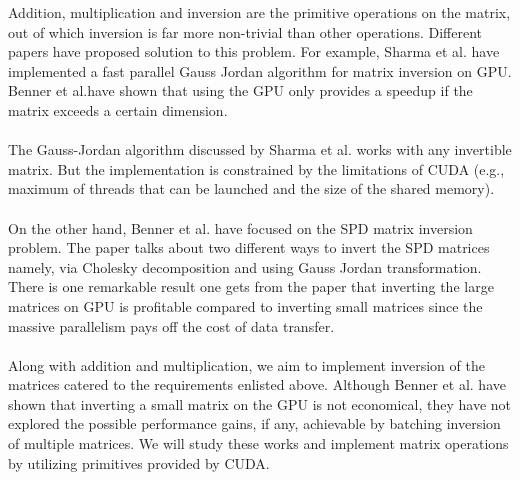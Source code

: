 \documentclass[11pt]{article}
\begin{document}
Addition, multiplication and inversion are the primitive operations on the matrix, out of which inversion is far more non-trivial than other operations. Different papers have proposed solution to this problem. For example, Sharma\cite{sharma} et al. have implemented a fast parallel Gauss Jordan algorithm for matrix inversion on GPU. Benner\cite{benner}  et al.have shown that using the GPU only provides a speedup if the matrix exceeds a certain dimension. \\\\
The Gauss-Jordan algorithm discussed by Sharma et al. works with any invertible matrix. But the implementation is constrained by the limitations of CUDA (e.g., maximum of threads that can be launched and the size of the shared memory).\\\\
On the other hand, Benner et al. have focused on the SPD matrix inversion problem. The paper talks about two different ways to invert the SPD matrices namely, via Cholesky decomposition and using Gauss Jordan transformation. There is one remarkable result one gets from the paper that inverting the large matrices on GPU is profitable compared to inverting small matrices since the massive parallelism pays off the cost of data transfer.\\\\
Along with addition and multiplication, we aim to implement inversion of the matrices catered to the requirements enlisted above. Although Benner et al. have shown that inverting a small matrix on the GPU is not economical, they have not explored the possible performance gains, if any, achievable by batching inversion of multiple matrices. We will study these works and implement matrix operations by utilizing primitives provided by CUDA.
\end{document}
